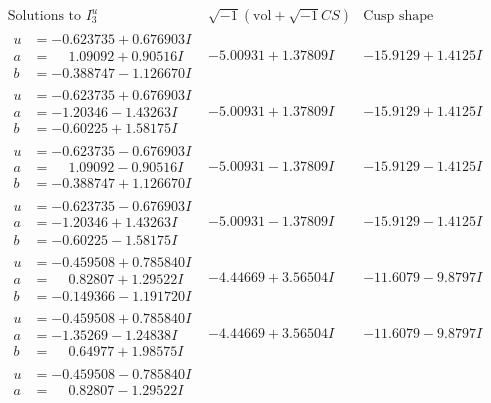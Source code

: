 \documentclass[1p]{elsarticle_modified}
\theoremstyle{definition}
\newcommand{\I}{\sqrt{-1}}
\begin{document}
$$\begin{array}{c|c|c}  
\text{Solutions to }I^u_{3}& \I (\text{vol} + \sqrt{-1}CS) & \text{Cusp shape}\\
 \hline 
\begin{aligned}
u &= -0.623735 + 0.676903 I \\
a &= \phantom{-}1.09092 + 0.90516 I \\
b &= -0.388747 - 1.126670 I\end{aligned}
 & -5.00931 + 1.37809 I & -15.9129 + 1.4125 I \\ \hline\begin{aligned}
u &= -0.623735 + 0.676903 I \\
a &= -1.20346 - 1.43263 I \\
b &= -0.60225 + 1.58175 I\end{aligned}
 & -5.00931 + 1.37809 I & -15.9129 + 1.4125 I \\ \hline\begin{aligned}
u &= -0.623735 - 0.676903 I \\
a &= \phantom{-}1.09092 - 0.90516 I \\
b &= -0.388747 + 1.126670 I\end{aligned}
 & -5.00931 - 1.37809 I & -15.9129 - 1.4125 I \\ \hline\begin{aligned}
u &= -0.623735 - 0.676903 I \\
a &= -1.20346 + 1.43263 I \\
b &= -0.60225 - 1.58175 I\end{aligned}
 & -5.00931 - 1.37809 I & -15.9129 - 1.4125 I \\ \hline\begin{aligned}
u &= -0.459508 + 0.785840 I \\
a &= \phantom{-}0.82807 + 1.29522 I \\
b &= -0.149366 - 1.191720 I\end{aligned}
 & -4.44669 + 3.56504 I & -11.6079 - 9.8797 I \\ \hline\begin{aligned}
u &= -0.459508 + 0.785840 I \\
a &= -1.35269 - 1.24838 I \\
b &= \phantom{-}0.64977 + 1.98575 I\end{aligned}
 & -4.44669 + 3.56504 I & -11.6079 - 9.8797 I \\ \hline\begin{aligned}
u &= -0.459508 - 0.785840 I \\
a &= \phantom{-}0.82807 - 1.29522 I \\

\end{aligned}
\end{array}$$
\end{document}
